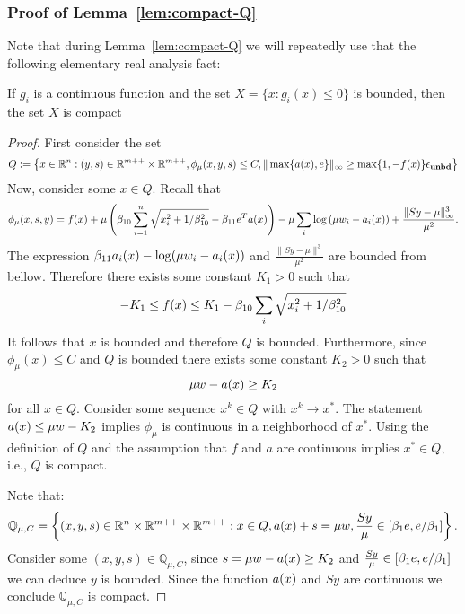 \documentclass{article}
\begin{document}
\subsubsection{Proof of Lemma~\ref{lem:compact-Q}} \label{sec:lem:compact-Q}

Note that during Lemma~\ref{lem:compact-Q} we will repeatedly use that the following elementary real analysis fact: 

\begin{fact}
If $g_i$ is a continuous function and the set $X = \{ x : g_i(x) \le 0 \}$ is bounded, then the set $X$ is compact
\end{fact}

\lemCompactQ*

\begin{proof}
First consider the set
$$
Q := \left\{ x \in \mathbb{R}^{n} : (y, s) \in \mathbb{R}^{m++} \times \mathbb{R}^{m++}, \phi_{\mu}(x,y,s) \le C, \| \max\{ a(x), e \} \|_{\infty} \ge \max\{1,-f(x) \} \epsilon_{\textbf{unbd}} \right\} 
$$
Now, consider some $x \in Q$. Recall that
$$
\phi_{\mu}(x, s, y) = f(x) + \mu \left( \beta_{10} \sum_{i = 1}^{n} \sqrt{x_i^2 + 1 / \beta_{10}^2} - \beta_{11} e^T a(x) \right)  - \mu  \sum_i{ \log \left( \mu w_i - a_i(x)  \right) } + \frac{\| S y - \mu \|_{\infty}^3}{\mu^2}.
$$
The expression $\beta_{11} a_i(x) - \log(\mu w_i - a_i(x))$ and $\frac{\| S y - \mu \|^3}{\mu^2}$ are bounded from bellow. Therefore there exists some constant $K_{1} > 0$ such that
$$
-K_{1} \le f(x) \le K_{1} - \beta_{10} \sum_{i}{\sqrt{x_i^2 + 1 / \beta_{10}^2}}
$$
It follows that $x$ is bounded and therefore $Q$ is bounded. Furthermore, since $\phi_{\mu}(x) \le C$ and $Q$ is bounded there exists some constant $K_{2} > 0$ such that
$$
\mu w - a(x) \ge K_{2}
$$
for all $x \in Q$. Consider some sequence $x^{k} \in Q$ with $x^{k} \rightarrow x^{*}$. The statement $a(x) \le \mu w - K_{2}$ implies $\phi_{\mu}$ is continuous in a neighborhood of $x^{*}$. Using the definition of $Q$ and the assumption that $f$ and $a$ are continuous implies $x^{*} \in Q$, i.e., $Q$ is compact. 


Note that:
$$
\mathbb{Q}_{\mu, C} = \left\{ (x,y,s) \in \mathbb{R}^{n} \times \mathbb{R}^{m++} \times \mathbb{R}^{m++} : x \in Q, a(x) + s = \mu w, \frac{S y}{\mu} \in [\beta_{1} e, e / \beta_{1}]\right\}.
$$
Consider some $(x,y,s) \in \mathbb{Q}_{\mu, C}$, since $s = \mu w - a(x) \ge K_{2}$ and $\frac{S y}{\mu} \in [\beta_{1} e, e / \beta_{1}]$ we can deduce $y$ is bounded. Since the function $a(x)$ and $S y$ are continuous we conclude $\mathbb{Q}_{\mu, C}$ is compact.
\end{proof}
\end{document}
